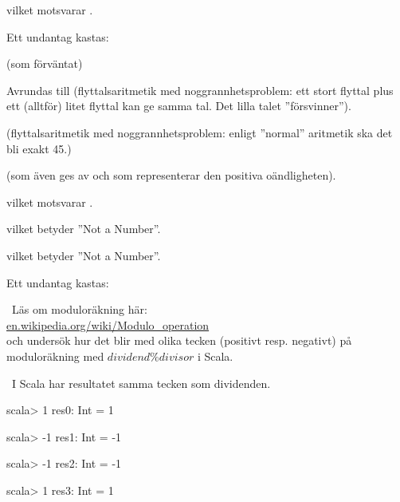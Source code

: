 \Subtask\Uberkurs {}

\Subtask\Uberkurs {}

\Subtask\Uberkurs {}

\Subtask\Uberkurs {}

\Subtask {}

\SOLUTION

\TaskSolved \what

\SubtaskSolved {} vilket motsvarar .

\SubtaskSolved Ett undantag kastas: 

\SubtaskSolved {} (som förväntat)

\SubtaskSolved Avrundas till  (flyttalsaritmetik med noggrannhetsproblem: ett stort flyttal plus ett (alltför) litet flyttal kan ge samma tal. Det lilla talet ''försvinner'').


\SubtaskSolved {} (flyttalsaritmetik med noggrannhetsproblem: enligt ''normal'' aritmetik ska det bli exakt 45.)

\SubtaskSolved {} (som även ges av  och som representerar den positiva oändligheten).

\SubtaskSolved {} vilket motsvarar .

\SubtaskSolved {} vilket betyder ''Not a Number''.

\SubtaskSolved {} vilket betyder ''Not a Number''.

\SubtaskSolved Ett undantag kastas: 

\QUESTEND




\QUESTBEGIN

\Task\Uberkurs \what~Läs om moduloräkning här: \\
 \href{https://en.wikipedia.org/wiki/Modulo\_operation}{en.wikipedia.org/wiki/Modulo\_operation} \\
 och undersök hur det blir med olika tecken (positivt resp. negativt) på moduloräkning med $dividend \% divisor$ i Scala.


\SOLUTION

\TaskSolved \what~I Scala har resultatet samma tecken som dividenden.
\begin{REPL}
scala> 1 %
res0: Int = 1

scala> -1 %
res1: Int = -1

scala> -1 %
res2: Int = -1

scala> 1 %
res3: Int = 1

\end{REPL}

